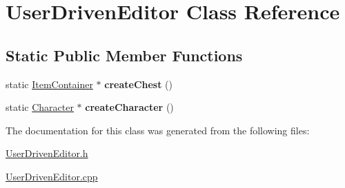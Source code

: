\hypertarget{class_user_driven_editor}{}\section{User\+Driven\+Editor Class Reference}
\label{class_user_driven_editor}
\subsection*{Static Public Member Functions}
\begin{DoxyCompactItemize}
\item 
\hypertarget{class_user_driven_editor_a3df8443432852b64259758491e121825}{}\label{class_user_driven_editor_a3df8443432852b64259758491e121825} 
static \hyperlink{class_item_container}{Item\+Container} $\ast$ {\bfseries create\+Chest} ()
\item 
\hypertarget{class_user_driven_editor_a493179a964f7c9b6798f9fdf6ed26ec6}{}\label{class_user_driven_editor_a493179a964f7c9b6798f9fdf6ed26ec6} 
static \hyperlink{class_character}{Character} $\ast$ {\bfseries create\+Character} ()
\end{DoxyCompactItemize}


The documentation for this class was generated from the following files\+:\begin{DoxyCompactItemize}
\item 
\hyperlink{_user_driven_editor_8h}{User\+Driven\+Editor.\+h}\item 
\hyperlink{_user_driven_editor_8cpp}{User\+Driven\+Editor.\+cpp}\end{DoxyCompactItemize}
